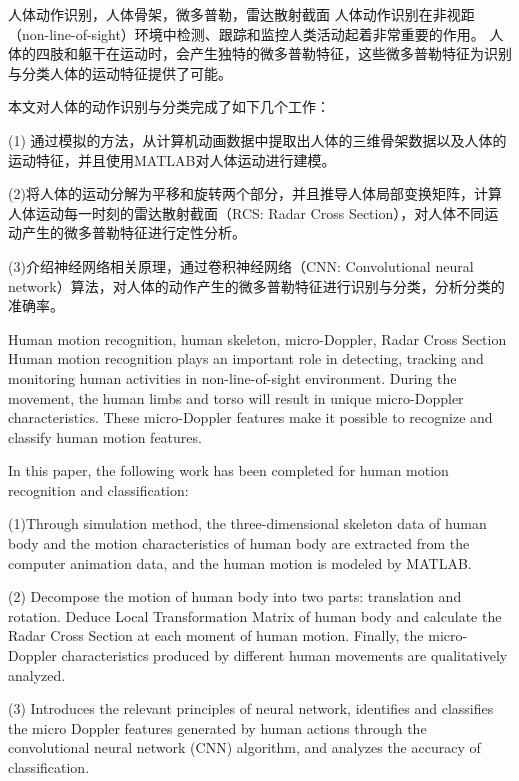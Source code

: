 \begin{中文摘要}{人体动作识别，人体骨架，微多普勒，雷达散射截面}
  人体动作识别在非视距（non-line-of-sight）环境中检测、跟踪和监控人类活动起着非常重要的作用。
  人体的四肢和躯干在运动时，会产生独特的微多普勒特征，这些微多普勒特征为识别与分类人体的运动特征提供了可能。


  本文对人体的动作识别与分类完成了如下几个工作：
  
  
  (1) 通过模拟的方法，从计算机动画数据中提取出人体的三维骨架数据以及人体的运动特征，并且使用MATLAB对人体运动进行建模。\par


  (2)将人体的运动分解为平移和旋转两个部分，并且推导人体局部变换矩阵，计算人体运动每一时刻的雷达散射截面（RCS: Radar Cross Section），对人体不同运动产生的微多普勒特征进行定性分析。\par


  (3)介绍神经网络相关原理，通过卷积神经网络（CNN: Convolutional neural network）算法，对人体的动作产生的微多普勒特征进行识别与分类，分析分类的准确率。\par

\end{中文摘要}

\begin{英文摘要}{Human motion recognition, human skeleton, micro-Doppler, Radar Cross Section}
  Human motion recognition plays an important role in detecting, tracking and monitoring human activities in non-line-of-sight environment.
  During the movement, the human limbs and torso will result in unique micro-Doppler characteristics. 
  These micro-Doppler features make it possible to recognize and classify human motion features.


  In this paper, the following work has been completed for human motion recognition and classification:


  (1)Through simulation method, the three-dimensional skeleton data of human body and the motion characteristics of human body are extracted from the computer animation data, 
  and the human motion is modeled by MATLAB.


  (2) Decompose the motion of human body into two parts: translation and rotation. 
  Deduce Local Transformation Matrix of human body and calculate the Radar Cross Section at each moment of human motion. 
  Finally, the micro-Doppler characteristics produced by different human movements are qualitatively analyzed. 


  (3) Introduces the relevant principles of neural network, 
  identifies and classifies the micro Doppler features generated by human actions through the convolutional neural network (CNN) algorithm, 
  and analyzes the accuracy of classification.


\end{英文摘要}
